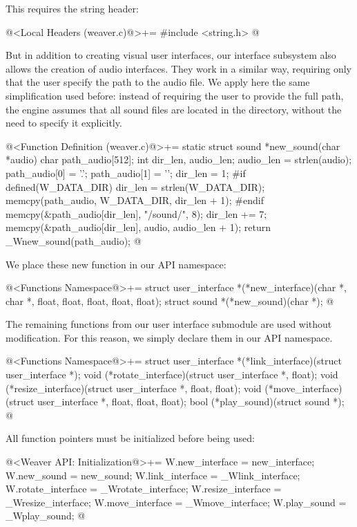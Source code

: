 This requires the string header:

\iniciocodigo
@<Local Headers (weaver.c)@>+=
#include <string.h>
@
\fimcodigo

But in addition to creating visual user interfaces, our interface
subsystem also allows the creation of audio interfaces. They work in a
similar way, requiring only that the user specify the path to the
audio file. We apply here the same simplification used before: instead
of requiring the user to provide the full path, the engine assumes
that all sound files are located in the  directory,
without the need to specify it explicitly.

\iniciocodigo
@<Function Definition (weaver.c)@>+=
static struct sound *new_sound(char *audio){
  char path_audio[512];
  int dir_len, audio_len;
  audio_len = strlen(audio);
  path_audio[0] = '.';
  path_audio[1] = '\0';
  dir_len = 1;
#if defined(W_DATA_DIR)
  dir_len = strlen(W_DATA_DIR);
  memcpy(path_audio, W_DATA_DIR, dir_len + 1);
#endif
  memcpy(&path_audio[dir_len], "/sound/", 8);
  dir_len += 7;
  memcpy(&path_audio[dir_len], audio, audio_len + 1);  
  return _Wnew_sound(path_audio);
}
@
\fimcodigo

We place these new function in our API namespace:

\iniciocodigo
@<Functions Namespace@>+=
struct user_interface *(*new_interface)(char *, char *, float, float,
                                        float, float, float);
struct sound *(*new_sound)(char *);
@
\fimcodigo

The remaining functions from our user interface submodule are used
without modification. For this reason, we simply declare them in our
API namespace.

\iniciocodigo
@<Functions Namespace@>+=
struct user_interface *(*link_interface)(struct user_interface *);
void (*rotate_interface)(struct user_interface *, float);
void (*resize_interface)(struct user_interface *, float, float);
void (*move_interface)(struct user_interface *, float, float, float);
bool (*play_sound)(struct sound *);
@
\fimcodigo

All function pointers must be initialized before being used:


\iniciocodigo
@<Weaver API: Initialization@>+=
W.new_interface = new_interface;
W.new_sound = new_sound;
W.link_interface = _Wlink_interface;
W.rotate_interface = _Wrotate_interface;
W.resize_interface = _Wresize_interface;
W.move_interface = _Wmove_interface;
W.play_sound = _Wplay_sound;
@
\fimcodigo

